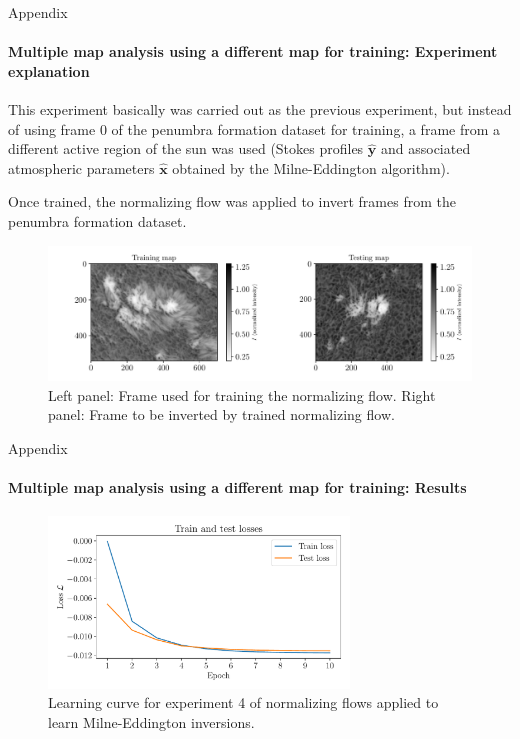 \documentclass{beamer}
\newcommand\matr[1]{\ensuremath{\boldsymbol{\mathbf{#1}}}}
\begin{document}
\begin{frame}[allowframebreaks]{Appendix}
	\framesubtitle{Multiple map analysis using a different map for training: Experiment explanation} %
	This experiment basically was carried out as the previous experiment, but instead of using frame 0 of the penumbra formation dataset for training, a frame from a different active region of the sun was used (Stokes profiles $\hat{\matr{y}}$ and associated atmospheric parameters $\hat{\matr{x}}$ obtained by the Milne-Eddington algorithm).
	
	Once trained, the normalizing flow was applied to invert frames from the penumbra formation dataset.
	\begin{figure}[h!]
		\centering
		\includegraphics[width=\textwidth]{figures/thesis/nf-milne-eddington-example-4-trainingmap-testingmap-nflows-piecewisequadratic.pdf}
		\caption{Left panel: Frame used for training the normalizing flow. Right panel: Frame to be inverted by trained normalizing flow.}
		\label{fig:nf-milne-eddington-example-4-trainingmap-testingmap-nflows-piecewisequadratic}
	\end{figure}
\end{frame}

\begin{frame}[allowframebreaks]{Appendix}
	\framesubtitle{Multiple map analysis using a different map for training: Results} %
	\begin{figure}[h]
		\centering
		\includegraphics[width=8cm]{figures/thesis/nf-milne-eddington-example-4-loss-nflows-piecewisequadratic.pdf}
		\caption{Learning curve for experiment 4 of normalizing flows applied to learn Milne-Eddington inversions.}
		\label{fig:nf-milne-eddington-example-4-loss-nflows-piecewisequadratic}
	\end{figure}
\end{frame}
\end{document}
